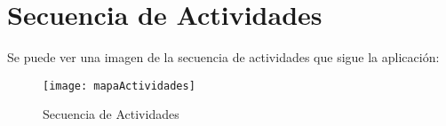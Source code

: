 %
%
%
%

\cleardoublepage
\chapter{Secuencia de Actividades}
\label{chap:activitiesSecuence}

Se puede ver una imagen de la secuencia de actividades que sigue la aplicación:

\begin{figure}[h]
	\centering
	\texttt{[image: mapaActividades]}
	\caption{Secuencia de Actividades}
	\label{fig:ActivitiesSecuence}
\end{figure}